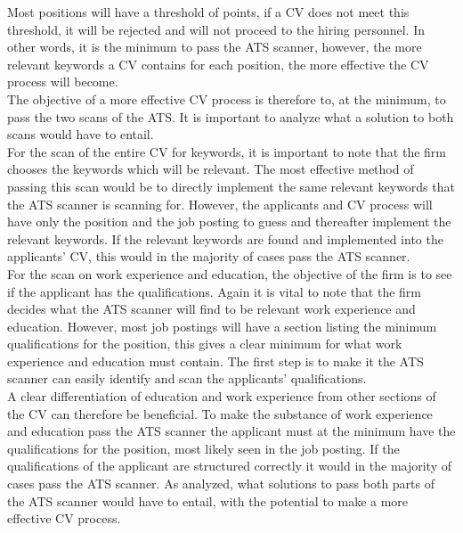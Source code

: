 Most positions will have a threshold of points, if a CV does not meet this threshold, 
it will be rejected and will not proceed to the hiring personnel.
In other words, it is the minimum to pass the ATS scanner, however, the more relevant keywords a CV contains for each position, 
the more effective the CV process will become. \\

The objective of a more effective CV process is therefore to, at the minimum, to pass the two scans of the ATS.
It is important to analyze what a solution to both scans would have to entail. \\
For the scan of the entire CV for keywords, it is important to note that the firm chooses the keywords which will be relevant.
The most effective method of passing this scan would be to directly implement the same relevant keywords that the ATS scanner is scanning for.
However, the applicants and CV process will have only the position and the job posting to guess and thereafter implement the relevant keywords.
If the relevant keywords are found and implemented into the applicants' CV, this would in the majority of cases pass the ATS scanner. \\

For the scan on work experience and education, the objective of the firm is to see if the applicant has the qualifications.
Again it is vital to note that the firm decides what the ATS scanner will find to be relevant work experience and education.
However, most job postings will have a section listing the minimum qualifications for the position, this gives a clear minimum for what work experience and education must contain.
The first step is to make it the ATS scanner can easily identify and scan the applicants' qualifications. \\

A clear differentiation of education and work experience from other sections of the CV can therefore be beneficial.
To make the substance of work experience and education pass the ATS scanner the applicant must at the minimum have the qualifications for the position, most likely seen in the job posting.
If the qualifications of the applicant are structured correctly it would in the majority of cases pass the ATS scanner.
As analyzed, what solutions to pass both parts of the ATS scanner would have to entail, with the potential to make a more effective CV process. \\

